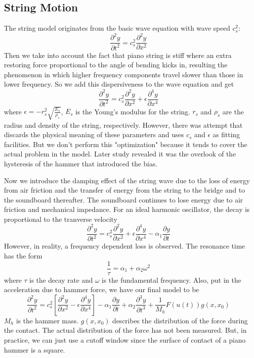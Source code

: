\documentclass[a4paper,12pt]{article}
\begin{document}
\subsection*{String Motion}
	The string model originates from the basic wave equation with wave speed $c_s^2$:
	\[ \frac{\partial^2 y}{\partial t^2} = c_s^2 \frac{\partial^2 y}{\partial x^2} \]
	Then we take into account the fact that piano string is stiff where an extra restoring force proportional to the angle of bending kicks in, resulting the phenomenon in which higher frequency components travel slower than those in lower frequency. So we add this dispersiveness to the wave equation and get
	\[ \frac{\partial^2 y}{\partial t^2} = c_s^2 \frac{\partial^2 y}{\partial x^2} + \epsilon \frac{\partial^4 y}{\partial x^4} \]
	where $\epsilon = -r_s^2 \sqrt{\frac{E_s}{\rho_s}}$, $E_s$ is the Young's modulus for the string. $r_s$ and $\rho_s$ are the radius and density of the string, respectively. However, there was attempt\cite{param_fit} that discards the physical meaning of these parameters and uses $c_s$ and $\epsilon$ as fitting facilities. But we don't perform this "optimization" because it tends to cover the actual problem in the model. Later study revealed it was the overlook of the hysteresis of the hammer that introduced the bias.
	
	Now we introduce the damping effect of the string wave due to the loss of energy from air friction and the transfer of energy from the string to the bridge and to the soundboard thereafter. The soundboard continues to lose energy due to air friction and mechanical impedance. For an ideal harmonic oscillator, the decay is proportional to the tranverse velocity 
	\[ 
		\frac{\partial^2 y}{\partial t^2} = 
	   			c_s^2 \frac{\partial^2 y}{\partial x^2} + 
	       		\epsilon \frac{\partial^4 y}{\partial x^4} - 
	   			\alpha_1 \frac{\partial y}{\partial t} 
	\]
	However, in reality, a frequency dependent loss is observed\cite{decay}. The resonance time has the form\cite{string_model}
	\[ \frac{1}{\tau} = \alpha_1 + \alpha_2 \omega^2 \]
	where $\tau$ is the decay rate and $\omega$ is the fundamental frequency. Also, put in the acceleration due to hammer force, we have our final model to be
	\[ \frac{\partial^2 y}{\partial t^2} = 
	   c_s^2 [\frac{\partial^2 y}{\partial x^2} - \epsilon \frac{\partial^4 y}{\partial x^4}] - 
	   \alpha_1 \frac{\partial y}{\partial t} + 
	   \alpha_2 \frac{\partial^3 y}{\partial t^3} + 
	   \frac{1}{M_h} F(u(t))g(x,x_0) \]
	   $M_h$ is the hammer mass. $g(x,x_0)$ describes the distribution of the force during the contact. The actual distribution of the force has not been measured. But, in practice, we can just use a cutoff window since the surface of contact of a piano hammer is a square.
	
\end{document}
